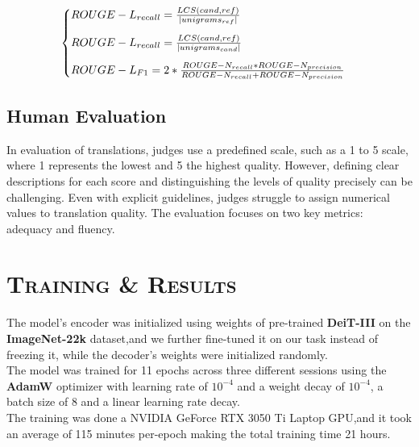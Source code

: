 \documentclass[a4paper,10pt]{article}
\begin{document}
$$
\begin{cases}
    ROUGE-L_{recall} = \frac{LCS(cand, ref)}{\mid unigrams_{ref} \mid}\\
 \noalign{\vskip9pt}
 ROUGE-L_{recall} = \frac{LCS(cand, ref)}{\mid unigrams_{cand} \mid}\\
 \noalign{\vskip9pt}
 ROUGE-L_{F1} = 2 * \frac{ROUGE-N_{recall} * ROUGE-N_{precision}}{ROUGE-N_{recall} + ROUGE-N_{precision}}
\end{cases}
$$

\subsection{Human Evaluation}

\noindent In evaluation of translations, judges use a predefined scale, such as a 1 to 5 scale, where 1 represents the lowest and 5 the highest quality. However, defining clear descriptions for each score and distinguishing the levels of quality precisely can be challenging. Even with explicit guidelines, judges struggle to assign numerical values to translation quality. The evaluation focuses on two key metrics: adequacy and fluency.

\newpage
\section{\scshape{Training \& Results}}

\noindent The model's encoder was initialized using weights of pre-trained \textbf{DeiT-III} on the \textbf{ImageNet-22k} dataset,and we further fine-tuned it on our task instead of freezing it, while the decoder's weights were initialized randomly.\\

\noindent The model was trained for 11 epochs across three different sessions using the \textbf{AdamW} optimizer with learning rate of $10^{-4}$ and a weight decay of $10^{-4}$, a batch size of $8$ and a linear learning rate decay.\\

\noindent The training was done a NVIDIA GeForce RTX 3050 Ti Laptop GPU,and it took an average of 115 minutes per-epoch making the total training time 21 hours.
\end{document}
